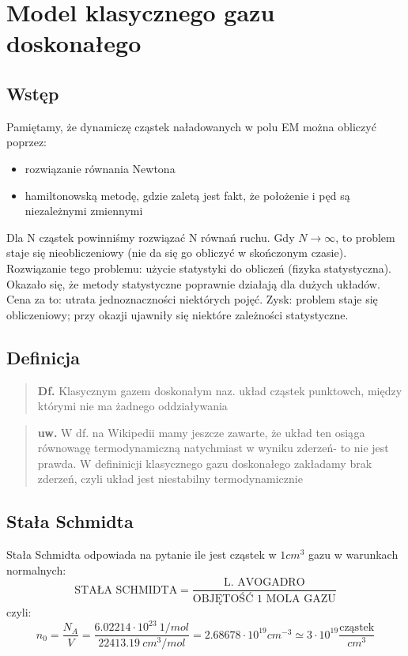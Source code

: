 
\section{Model klasycznego gazu doskonałego}
\subsection{Wstęp}
Pamiętamy, że dynamiczę cząstek naładowanych w polu EM można obliczyć poprzez:
\begin{itemize}
\item rozwiązanie równania Newtona
\item hamiltonowską metodę, gdzie zaletą jest fakt, że położenie i pęd są niezależnymi zmiennymi
\end{itemize}
Dla N cząstek powinniśmy rozwiązać N równań ruchu. Gdy $N\rightarrow\infty$, to problem staje się nieobliczeniowy (nie da się go obliczyć w skończonym czasie).\\
Rozwiązanie tego problemu: użycie statystyki do obliczeń (fizyka statystyczna). Okazało się, że metody statystyczne poprawnie działają dla dużych układów. Cena za to: utrata jednoznaczności niektórych pojęć. Zysk: problem staje się obliczeniowy; przy okazji ujawniły się niektóre zależności statystyczne. 
\subsection{Definicja}
\begin{verse}\textbf{Df.} Klasycznym gazem doskonałym naz. układ cząstek punktowch, między którymi nie ma żadnego oddziaływania \end{verse}
\begin{verse}\textbf{uw.} W df. na Wikipedii mamy jeszcze zawarte, że układ ten osiąga równowagę termodynamiczną natychmiast w wyniku zderzeń- to nie jest prawda. W defininicji klasycznego gazu doskonałego zakładamy brak zderzeń, czyli układ jest niestabilny termodynamicznie \end{verse}
\subsection{Stała Schmidta}
Stała Schmidta odpowiada na pytanie ile jest cząstek w $1 cm^3$ gazu w warunkach normalnych:
\begin{equation}\text{STAŁA SCHMIDTA}=\frac{\text{L. AVOGADRO}}{\text{OBJĘTOŚĆ 1 MOLA GAZU}}\end{equation}
czyli:
\begin{equation}n_0=\frac{N_A}{V}=\frac{6.02214\cdot 10^{23} ~{1/mol}}{22413.19 ~cm^3/mol}=2.68678\cdot 10^{19} cm^{-3} \simeq 3\cdot 10^{19} \frac{\text{cząstek}}{cm^3}\end{equation}
